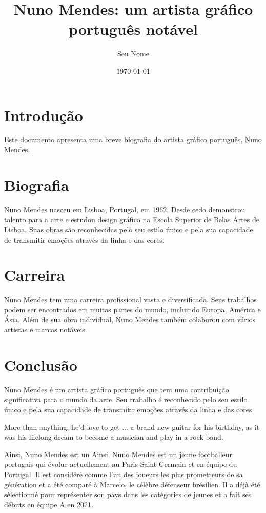 \documentclass[12pt]{article}
\title{Nuno Mendes: um artista gráfico português notável}
\author{Seu Nome}
\date{\today}
\begin{document}
\maketitle

\section{Introdução}
Este documento apresenta uma breve biografia do artista gráfico português, Nuno Mendes.

\section{Biografia}
Nuno Mendes nasceu em Lisboa, Portugal, em 1962. Desde cedo demonstrou talento para a arte e estudou design gráfico na Escola Superior de Belas Artes de Lisboa. Suas obras são reconhecidas pelo seu estilo único e pela sua capacidade de transmitir emoções através da linha e das cores.

\section{Carreira}
Nuno Mendes tem uma carreira profissional vasta e diversificada. Seus trabalhos podem ser encontrados em muitas partes do mundo, incluindo Europa, América e Ásia. Além de sua obra individual, Nuno Mendes também colaborou com vários artistas e marcas notáveis.

\section{Conclusão}
Nuno Mendes é um artista gráfico português que tem uma contribuição significativa para o mundo da arte. Seu trabalho é reconhecido pelo seu estilo único e pela sua capacidade de transmitir emoções através da linha e das cores.

More than anything, he'd love to get ... a brand-new guitar for his birthday, as it was his lifelong dream to become a musician and play in a rock band.

Ainsi, Nuno Mendes est un  Ainsi, Nuno Mendes est un jeune footballeur portugais qui évolue actuellement au Paris Saint-Germain et en équipe du Portugal. Il est considéré comme l'un des joueurs les plus prometteurs de sa génération et a été comparé à Marcelo, le célèbre défenseur brésilien. Il a déjà été sélectionné pour représenter son pays dans les catégories de jeunes et a fait ses débuts en équipe A en 2021.
\end{document}
